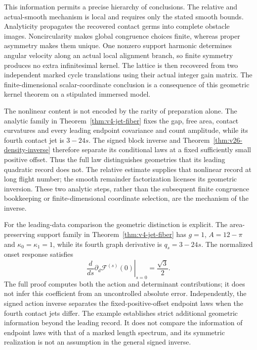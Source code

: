This information permits a precise hierarchy of conclusions.  The
relative and actual-smooth mechanism is local and requires only the
stated smooth bounds.  Analyticity propagates the recovered contact
germs into complete obstacle images.  Noncircularity makes global
congruence choices finite, whereas proper asymmetry makes them unique.
One nonzero support harmonic determines angular velocity along an
actual local alignment branch, so finite symmetry produces no extra
infinitesimal kernel.  The lattice is then recovered from two independent
marked cycle translations using their actual integer gain matrix.
The finite-dimensional scalar-coordinate conclusion is a consequence
of this geometric kernel theorem on a stipulated immersed model.

The nonlinear content is not encoded by the rarity of preparation alone.
The analytic family in Theorem~\ref{thm:v4-jet-fiber} fixes the gap,
free area, contact curvatures and every leading endpoint covariance and
count amplitude, while its fourth contact jet is $3-24s$.  The signed
block inverse and Theorem~\ref{thm:v26-density-inverse} therefore
separate its conditional laws at a fixed sufficiently small positive
offset.  Thus the full law distinguishes geometries that its leading
quadratic record does not.  The relative estimate supplies that nonlinear
record at long flight number; the smooth remainder factorization licenses
its geometric inversion.  These two analytic steps, rather than the
subsequent finite congruence bookkeeping or finite-dimensional coordinate
selection, are the mechanism of the inverse.

For the leading-data comparison the geometric distinction is explicit.
The area-preserving support family in Theorem~\ref{thm:v4-jet-fiber}
has $g=1$, $A=12-\pi$ and $\kappa_0=\kappa_1=1$, while its
fourth graph derivative is $q_s=3-24s$.  The normalized onset response
satisfies
\[
 \left.\frac{d}{ds}\partial_d\mathcal F^{(s)}(0)\right|_{s=0}
                         =\frac{\sqrt3}{2}.
\]
The full proof computes both the action and determinant contributions;
it does not infer this coefficient from an uncontrolled absolute error.
Independently, the signed action inverse separates the fixed-positive-offset
endpoint laws when the fourth contact jets differ.  The example establishes
strict additional geometric information beyond the leading record.  It
does not compare the information of endpoint laws with that of a marked
length spectrum, and its symmetric realization is not an assumption in
the general signed inverse.

